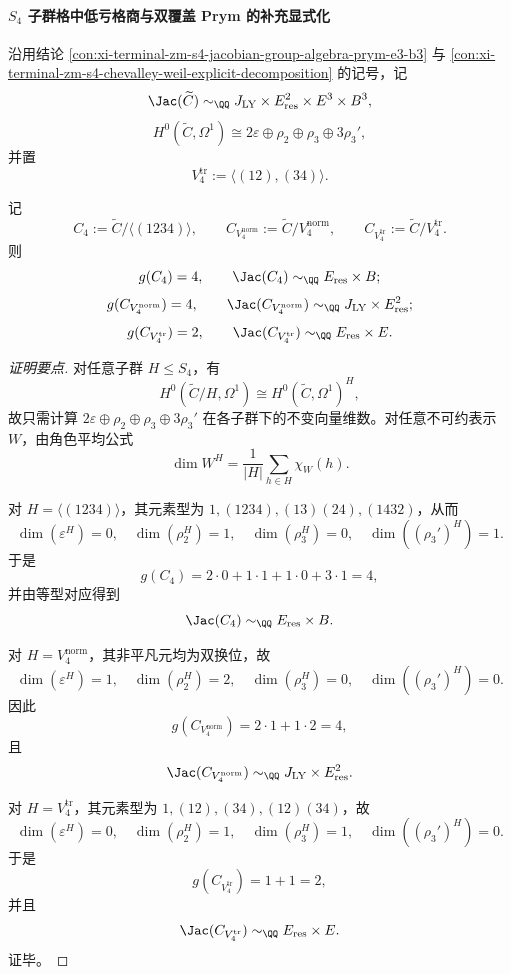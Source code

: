 \paragraph{\texorpdfstring{$S_4$}{S4} 子群格中低亏格商与双覆盖 Prym 的补充显式化}
沿用结论 \ref{con:xi-terminal-zm-s4-jacobian-group-algebra-prym-e3-b3} 与
\ref{con:xi-terminal-zm-s4-chevalley-weil-explicit-decomposition} 的记号，记
\[
\Jac(\widetilde C)\sim_{\QQ}J_{\mathrm{LY}}\times E_{\mathrm{res}}^2\times E^3\times B^3,
\]
\[
H^0(\widetilde C,\Omega^1)\cong 2\varepsilon\oplus \rho_2\oplus \rho_3\oplus 3\rho_3',
\]
并置
\[
V_4^{\mathrm{tr}}:=\langle(12),(34)\rangle.
\]

\begin{conclusion}\label{con:xi-terminal-zm-s4-lowgenus-subgroup-quotients-jacobian-explicit}
记
\[
C_4:=\widetilde C/\langle(1234)\rangle,\qquad
C_{V_4^{\mathrm{norm}}}:=\widetilde C/V_4^{\mathrm{norm}},\qquad
C_{V_4^{\mathrm{tr}}}:=\widetilde C/V_4^{\mathrm{tr}}.
\]
则
\[
g(C_4)=4,\qquad \Jac(C_4)\sim_{\QQ}E_{\mathrm{res}}\times B;
\]
\[
g(C_{V_4^{\mathrm{norm}}})=4,\qquad
\Jac(C_{V_4^{\mathrm{norm}}})\sim_{\QQ}J_{\mathrm{LY}}\times E_{\mathrm{res}}^2;
\]
\[
g(C_{V_4^{\mathrm{tr}}})=2,\qquad
\Jac(C_{V_4^{\mathrm{tr}}})\sim_{\QQ}E_{\mathrm{res}}\times E.
\]
\end{conclusion}
\begin{proof}[证明要点]
对任意子群 \(H\le S_4\)，有
\[
H^0(\widetilde C/H,\Omega^1)\cong H^0(\widetilde C,\Omega^1)^H,
\]
故只需计算
\(
2\varepsilon\oplus \rho_2\oplus \rho_3\oplus 3\rho_3'
\)
在各子群下的不变向量维数。对任意不可约表示 \(W\)，由角色平均公式
\[
\dim W^H=\frac{1}{|H|}\sum_{h\in H}\chi_W(h).
\]

对 \(H=\langle(1234)\rangle\)，其元素型为
\(
1,(1234),(13)(24),(1432)
\)，从而
\[
\dim(\varepsilon^H)=0,\quad
\dim(\rho_2^H)=1,\quad
\dim(\rho_3^H)=0,\quad
\dim((\rho_3')^H)=1.
\]
于是
\[
g(C_4)=2\cdot 0+1\cdot 1+1\cdot 0+3\cdot 1=4,
\]
并由等型对应得到
\[
\Jac(C_4)\sim_{\QQ}E_{\mathrm{res}}\times B.
\]

对 \(H=V_4^{\mathrm{norm}}\)，其非平凡元均为双换位，故
\[
\dim(\varepsilon^H)=1,\quad
\dim(\rho_2^H)=2,\quad
\dim(\rho_3^H)=0,\quad
\dim((\rho_3')^H)=0.
\]
因此
\[
g(C_{V_4^{\mathrm{norm}}})=2\cdot 1+1\cdot 2=4,
\]
且
\[
\Jac(C_{V_4^{\mathrm{norm}}})\sim_{\QQ}J_{\mathrm{LY}}\times E_{\mathrm{res}}^2.
\]

对 \(H=V_4^{\mathrm{tr}}\)，其元素型为
\(
1,(12),(34),(12)(34)
\)，故
\[
\dim(\varepsilon^H)=0,\quad
\dim(\rho_2^H)=1,\quad
\dim(\rho_3^H)=1,\quad
\dim((\rho_3')^H)=0.
\]
于是
\[
g(C_{V_4^{\mathrm{tr}}})=1+1=2,
\]
并且
\[
\Jac(C_{V_4^{\mathrm{tr}}})\sim_{\QQ}E_{\mathrm{res}}\times E.
\]
证毕。
\end{proof}

